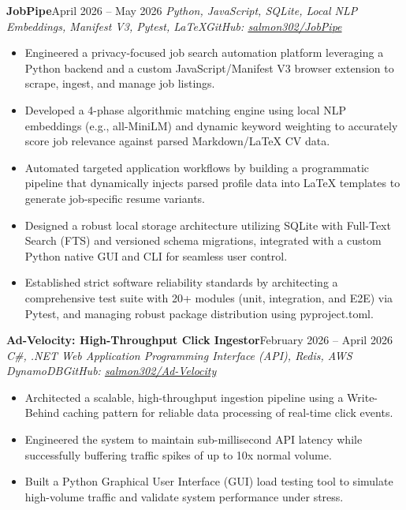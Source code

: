\documentclass[letterpaper,11pt]{article}
\newcommand{\resumeEntry}[4]{
    \vspace{2pt}
    \noindent\textbf{#1}\hfill{#2}
    \newline
    \noindent\textit{#3}\hfill\textit{#4}
    \vspace{-3pt}
}
\newcommand{\resumeItemListStart}{\begin{itemize}[label=$\bullet$, leftmargin=1.1em, itemsep=0pt, parsep=0pt, topsep=2pt]}
\newcommand{\resumeItemListEnd}{\end{itemize}}
\begin{document}
    \resumeEntry
        {JobPipe}
        {April 2026 – May 2026}
        {Python, JavaScript, SQLite, Local NLP Embeddings, Manifest V3, Pytest, LaTeX}
        {GitHub: \href{https://github.com/salmon302/JobPipe}{salmon302/JobPipe}}
    \resumeItemListStart
        \item Engineered a privacy-focused job search automation platform leveraging a Python backend and a custom JavaScript/Manifest V3 browser extension to scrape, ingest, and manage job listings.
        \item Developed a 4-phase algorithmic matching engine using local NLP embeddings (e.g., all-MiniLM) and dynamic keyword weighting to accurately score job relevance against parsed Markdown/LaTeX CV data.
        \item Automated targeted application workflows by building a programmatic pipeline that dynamically injects parsed profile data into LaTeX templates to generate job-specific resume variants.
        \item Designed a robust local storage architecture utilizing SQLite with Full-Text Search (FTS) and versioned schema migrations, integrated with a custom Python native GUI and CLI for seamless user control.
        \item Established strict software reliability standards by architecting a comprehensive test suite with 20+ modules (unit, integration, and E2E) via Pytest, and managing robust package distribution using pyproject.toml.
    \resumeItemListEnd

    \resumeEntry
        {Ad-Velocity: High-Throughput Click Ingestor}
        {February 2026 – April 2026}
        {C\#, .NET Web Application Programming Interface (API), Redis, AWS DynamoDB}
        {GitHub: \href{https://github.com/salmon302/Ad-Velocity}{salmon302/Ad-Velocity}}
    \resumeItemListStart
        \item Architected a scalable, high-throughput ingestion pipeline using a Write-Behind caching pattern for reliable data processing of real-time click events.
        \item Engineered the system to maintain sub-millisecond API latency while successfully buffering traffic spikes of up to 10x normal volume.
        \item Built a Python Graphical User Interface (GUI) load testing tool to simulate high-volume traffic and validate system performance under stress.
    \resumeItemListEnd
\end{document}
